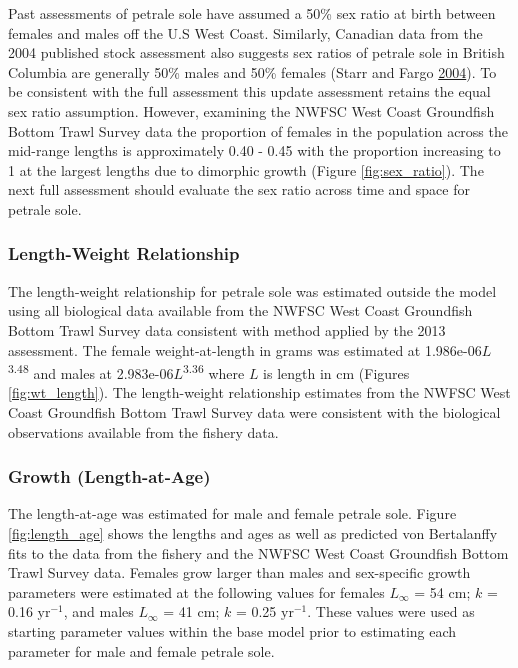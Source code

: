 \documentclass[12pt,]{article}
\begin{document}
Past assessments of petrale sole have assumed a 50\% sex ratio at birth
between females and males off the U.S West Coast. Similarly, Canadian
data from the 2004 published stock assessment also suggests sex ratios
of petrale sole in British Columbia are generally 50\% males and 50\%
females (Starr and Fargo
\protect\hyperlink{ref-starr_petrale_2004}{2004}). To be consistent with
the full assessment this update assessment retains the equal sex ratio
assumption. However, examining the NWFSC West Coast Groundfish Bottom
Trawl Survey data the proportion of females in the population across the
mid-range lengths is approximately 0.40 - 0.45 with the proportion
increasing to 1 at the largest lengths due to dimorphic growth (Figure
\ref{fig:sex_ratio}). The next full assessment should evaluate the sex
ratio across time and space for petrale sole.

\subsubsection{Length-Weight
Relationship}\label{length-weight-relationship}

The length-weight relationship for petrale sole was estimated outside
the model using all biological data available from the NWFSC West Coast
Groundfish Bottom Trawl Survey data consistent with method applied by
the 2013 assessment. The female weight-at-length in grams was estimated
at 1.986e-06\(L\)\textsuperscript{3.48} and males at
2.983e-06\(L\)\textsuperscript{3.36} where \(L\) is length in cm
(Figures \ref{fig:wt_length}). The length-weight relationship estimates
from the NWFSC West Coast Groundfish Bottom Trawl Survey data were
consistent with the biological observations available from the fishery
data.

\subsubsection{Growth (Length-at-Age)}\label{growth-length-at-age}

The length-at-age was estimated for male and female petrale sole. Figure
\ref{fig:length_age} shows the lengths and ages as well as predicted von
Bertalanffy fits to the data from the fishery and the NWFSC West Coast
Groundfish Bottom Trawl Survey data. Females grow larger than males and
sex-specific growth parameters were estimated at the following values
for females \(L_{\infty}\) = 54 cm; \(k\) = 0.16 \(\text{yr}^{-1}\), and
males \(L_{\infty}\) = 41 cm; \(k\) = 0.25 \(\text{yr}^{-1}\). These
values were used as starting parameter values within the base model
prior to estimating each parameter for male and female petrale sole.
\end{document}
